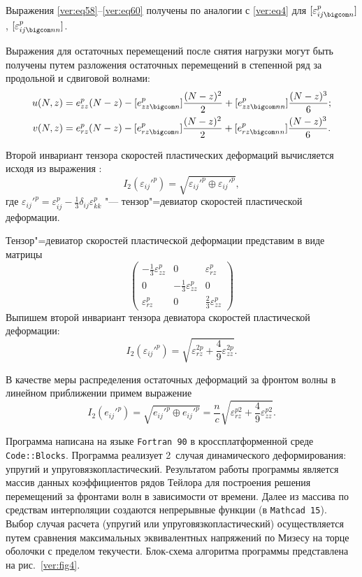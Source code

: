 Выражения \eqref{ver:eq58}--\eqref{ver:eq60} получены по аналогии с \eqref{ver:eq4} для $[\varepsilon_{ij\bigcom n}^p]$, $[\varepsilon_{ij\bigcom nn}^p]$.

Выражения для остаточных перемещений после снятия нагрузки могут быть получены путем разложения остаточных перемещений в степенной ряд за продольной и сдвиговой волнами:
\begin{gather}
\label{ver:eq61}
u(N,z)=e_{zz}^p(N-z)-[e_{zz\bigcom n}^p]\frac{(N-z)^2}{2}+[e_{zz\bigcom nn}^p]\frac{(N-z)^3}{6};
\\
\label{ver:eq62}
v(N,z)=e_{rz}^p(N-z)-[e_{rz\bigcom n}^p]\frac{(N-z)^2}{2}+[e_{rz\bigcom nn}^p]\frac{(N-z)^3}{6}.
\end{gather}

Второй инвариант тензора скоростей пластических деформаций вычисляется исходя из выражения \cite{ver:bib3}:
\begin{equation}
\label{ver:eq63}
I_2(\varepsilon_{ij}'^p)=\sqrt{\varepsilon_{ij}'^p\oplus\varepsilon_{ij}'^p},
\end{equation}
где $\varepsilon_{ij}'^p=\varepsilon_{ij}^p-\frac 13 \delta_{ij}\varepsilon_{kk}^p$ "--- тензор"=девиатор скоростей пластической деформации.

Тензор"=девиатор скоростей пластической деформации представим в виде матрицы
$$\begin{pmatrix}
-\frac 13\varepsilon_{zz}^{p} & 0 & \varepsilon_{rz}^{p}\\
0 & -\frac 13\varepsilon_{zz}^{p} & 0\\
\varepsilon_{rz}^{p} & 0 & \frac 23\varepsilon_{zz}^{p}
\end{pmatrix}$$
Выпишем второй инвариант тензора девиатора скоростей пластической деформации:
\begin{equation}
\label{ver:eq64}
I_2(\varepsilon_{ij}'^p)=\sqrt{\varepsilon_{rz}^{2p}+ \frac 49 \varepsilon_{zz}^{2p}}.
\end{equation}

В качестве меры распределения остаточных деформаций за фронтом волны в линейном приближении примем выражение
\begin{equation}
\label{ver:eq65}
I_2(e_{ij}'^p)=\sqrt{e_{ij}'^p\oplus e_{ij}'^p}=\frac{n}{c}\sqrt{\varepsilon_{rz}^{p2}+\frac 49 \varepsilon_{zz}^{p2}}.
\end{equation}

\smallskip

Программа \cite{ver:bib11} написана на языке  {\tt Fortran 90} в кроссплатформенной среде {\tt Code::Blocks}. Программа реализует 2~случая динамического деформирования: упругий и упруговязкопластический. 
Результатом работы программы является массив данных коэффициентов рядов Тейлора для построения решения перемещений за фронтами волн в зависимости от времени. Далее из массива по средствам интерполяции создаются непрерывные функции (в {\tt Mathcad 15}). 
Выбор случая расчета (упругий или упруговязкопластический) осуществляется путем сравнения максимальных эквивалентных напряжений по Мизесу на торце оболочки с пределом текучести.
Блок-схема алгоритма программы представлена на рис.~\ref{ver:fig4}.

